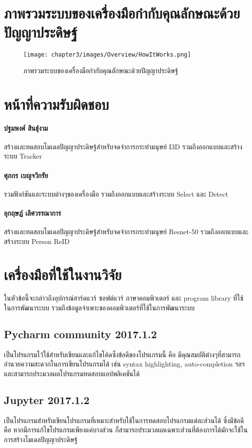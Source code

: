 \section{ภาพรวมระบบของเครื่องมือกำกับคุณลักษณะด้วยปัญญาประดิษฐ์}
\begin{figure}[!ht]
    \centering
    \texttt{[image: chapter3/images/Overview/HowItWorks.png]}
    \caption{ภาพรวมระบบของเครื่องมือกำกับคุณลักษณะด้วยปัญญาประดิษฐ์}
    \label{fig:labeling_overview}
\end{figure}
\clearpage

\section{หน้าที่ความรับผิดชอบ} 
\paragraph*{ปฐมพงศ์ สินธุ์งาม}
สร้างและทดสอบโมเดลปัญญาประดิษฐ์สำหรับจดจำการกระทำมนุษย์ I3D รวมถึงออกแบบและสร้างระบบ Tracker
\paragraph*{ศุภกร เบญจวิกรัย}
รวมฟังก์ชันและระบบต่างๆของเครื่องมือ รวมถึงออกแบบและสร้างระบบ Select และ Detect
\paragraph*{อุกฤษฎ์ เลิศวรรณาการ}
สร้างและทดสอบโมเดลปัญญาประดิษฐ์สำหรับจดจำการกระทำมนุษย์ Resnet-50 รวมถึงออกแบบและสร้างระบบ Person ReID 

\vspace{6mm}
\section{เครื่องมือที่ใช้ในงานวิจัย}
ในหัวข้อนี้จะกล่าวถึงอุปกรณ์ฮาร์ดแวร์ ซอฟต์แวร์ ภาษาคอมพิวเตอร์ และ program library ที่ใช้ในการพัฒนาระบบ รวมถึงข้อมูลจำเพาะของคอมพิวเตอร์ที่ใช้ในการพัฒนาระบบ
\subsection*{Pycharm community 2017.1.2} 
เป็นโปรแกรมไว้ใช้สำหรับเขียนและแก้ไขโค้ดซึ่งข้อดีของโปรแกรมนี้ คือ มีคุณสมบัติต่างๆที่สามารถอำนวยความสะดวกในการเขียนโปรแกรมได้ เช่น 
syntax highlighting, auto-completion ฯลฯ และสามารถประมวลผลโปรแกรมทดสอบแอปพลิเคชันได้

\subsection*{Jupyter 2017.1.2} เป็นโปรแกรมสำหรับเขียนโปรแกรมที่เหมาะสำหรับใช้ในการทดสอบโปรแกรมแต่ละส่วนได้ ซึ่งมีข้อดีคือ 
หากมีการแก้ไขโปรแกรมเพียงแค่บางส่วน ก็สามารถประมวลผลเฉพาะส่วนที่ต้องการได้มักจะใช้ในการสร้างโมเดลปัญญาประดิษฐ์


